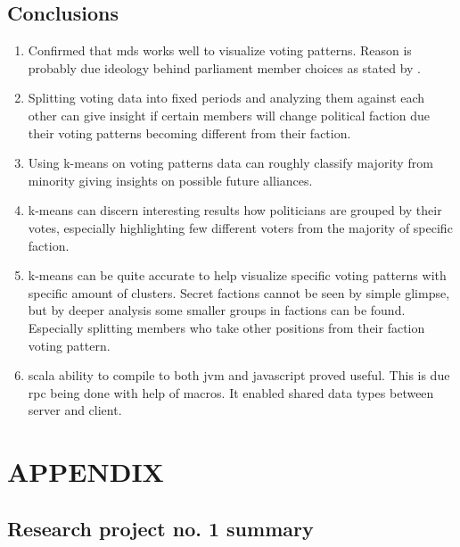 \documentclass[a4paper,12pt]{article}
\begin{document}
	\clearpage
	
	\subsection{Conclusions}
	
	
	\begin{enumerate}
		\item Confirmed that \acrfull{mds} works well to visualize voting patterns. Reason is probably due ideology behind parliament member choices as stated by \cite{poole_2005}.
		\item Splitting voting data into fixed periods and analyzing them against each other can give insight if certain members will change political faction due their voting patterns becoming different from their faction.
		\item Using \gls{k-means} on voting patterns data can roughly classify majority from minority giving insights on possible future alliances.
		\item \gls{k-means} can discern interesting results how politicians are grouped by their votes, especially highlighting few different voters from the majority of specific faction.
		\item \gls{k-means} can be quite accurate to help visualize specific voting patterns with specific amount of clusters. Secret factions cannot be seen by simple glimpse, but by deeper analysis some smaller groups in factions can be found. Especially splitting members who take other positions from their faction voting pattern.
		\item \gls{scala} ability to compile to both \gls{jvm} and \gls{javascript} proved useful. This is due \acrshort{rpc} being done with help of macros. It enabled shared data types between server and client.
		
		
	\end{enumerate}
	
	\clearpage
	
	{}
	
	
	\clearpage
	
	
	\appendix
	\section{APPENDIX}
	
	\subsection{Research project no. 1 summary}
	
\end{document}
